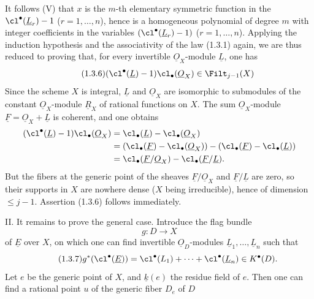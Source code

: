 It follows (V) that $x$ is the $m$-th elementary symmetric function in the $\cl^{\bullet}(\underline{L}_r)-1$ ($r=1,\ldots,n$), hence is a homogeneous polynomial of degree $m$ with integer coefficients in the variables $(\cl^{\bullet}(\underline{L}_r)-1)$ ($r=1,\ldots,n$). Applying the induction hypothesis and the associativity of the law (1.3.1) again, we are thus reduced to proving that, for every invertible $\underline{O}_X$-module $\underline{L}$, one has
\begin{equation}\tag{1.3.6}
(\cl^{\bullet}(\underline{L})-1)\cl_\bullet(\underline{O}_X)\in\Filt_{j-1}(X)
\end{equation}
Since the scheme $X$ is integral, $\underline{L}$ and $\underline{O}_X$ are isomorphic to submodules of the constant $\underline{O}_X$-module $\underline{R}_X$ of rational functions on $X$. The sum $\underline{O}_X$-module $\underline{F}=\underline{O}_X+\underline{L}$ is coherent, and one obtains
\begin{align*}
(\cl^{\bullet}(\underline{L})-1)\cl_\bullet(\underline{O}_X)
&=\cl_\bullet(\underline{L})-\cl_\bullet(\underline{O}_X)\\
&=(\cl_\bullet(\underline{F})-\cl_\bullet(\underline{O}_X))-(\cl_\bullet(\underline{F})-\cl_\bullet(\underline{L}))\\
&=\cl_\bullet(\underline{F}/\underline{O}_X)-\cl_\bullet(\underline{F}/\underline{L}).
\end{align*}
But the fibers at the generic point of the sheaves $\underline{F}/\underline{O}_X$ and $\underline{F}/\underline{L}$ are zero, so their supports in $X$ are nowhere dense ($X$ being irreducible), hence of dimension $\leq j-1$. Assertion (1.3.6) follows immediately.

II. It remains to prove the general case. Introduce the flag bundle
\[
g:D\longrightarrow X
\]
of $\underline{E}$ over $X$, on which one can find invertible $\underline{O}_D$-modules $\underline{L}_1,\ldots,\underline{L}_n$ such that
\begin{equation}\tag{1.3.7}
g^*(\cl^{\bullet}(\underline{E}))=\cl^{\bullet}(L_1)+\cdots+\cl^{\bullet}(\underline{L}_n)\in K^{\bullet}(D).
\end{equation}
Let $e$ be the generic point of $X$, and $\underline{k}(e)$ the residue field of $e$. Then one can find a rational point $u$ of the generic fiber $D_e$ of $D$


%

